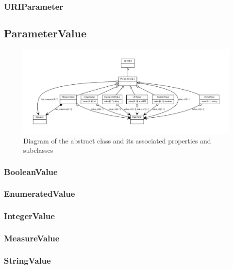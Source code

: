 \subsubsection{URIParameter}
\label{sec:URIParameter}


\subsection{ParameterValue}
\label{sec:ParameterValue}

\begin{figure}[ht]
\begin{center}
\includegraphics[scale=0.6]{figures/ParameterValue_definition_and_abstraction}
\caption[]{Diagram of the  abstract class and its associated properties and subclasses}
\label{uml:ParameterValue}
\end{center}
\end{figure}

\subsubsection{BooleanValue}
\label{sec:BooleanValue}

\subsubsection{EnumeratedValue}
\label{sec:EnumeratedValue}

\subsubsection{IntegerValue}
\label{sec:IntegerValue}

\subsubsection{MeasureValue}
\label{sec:MeasureValue}

\subsubsection{StringValue}
\label{sec:StringValue}

